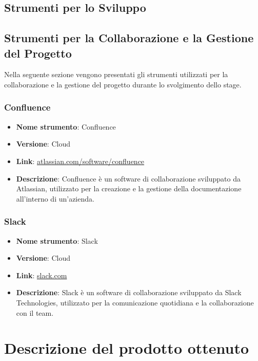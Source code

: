 \begin{itemize}
\subsection{Strumenti per lo Sviluppo}

\subsection{Strumenti per la Collaborazione e la Gestione del Progetto}
Nella seguente sezione vengono presentati gli strumenti utilizzati per la collaborazione e la gestione del progetto durante lo svolgimento dello stage.

\subsubsection{Confluence}
\begin{itemize}
      \item \textbf{Nome strumento}: Confluence
      \item \textbf{Versione}: Cloud
      \item \textbf{Link}: \href{https://www.atlassian.com/software/confluence}{atlassian.com/software/confluence}
      \item \textbf{Descrizione}: Confluence è un software di collaborazione sviluppato da Atlassian, utilizzato per la creazione e la gestione della documentazione
            all'interno di un'azienda.
\end{itemize}

\subsubsection{Slack}
\begin{itemize}
      \item \textbf{Nome strumento}: Slack
      \item \textbf{Versione}: Cloud
      \item \textbf{Link}: \href{https://slack.com/}{slack.com}
      \item \textbf{Descrizione}: Slack è un software di collaborazione sviluppato da Slack Technologies, utilizzato per la comunicazione quotidiana e la collaborazione
            con il team.
\end{itemize}

\section{Descrizione del prodotto ottenuto}


\end{itemize}
